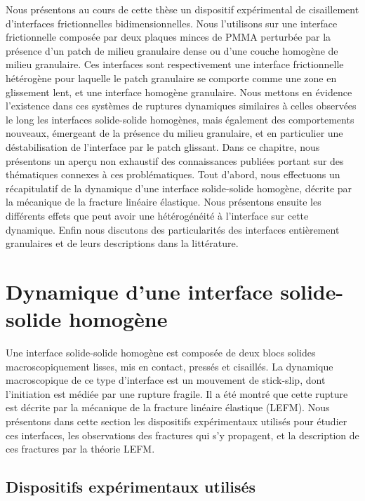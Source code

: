 Nous présentons au cours de cette thèse un dispositif expérimental de cisaillement d'interfaces frictionnelles bidimensionnelles. Nous l'utilisons sur une interface frictionnelle composée par deux plaques minces de PMMA perturbée par la présence d'un patch de milieu granulaire dense ou d'une couche homogène de milieu granulaire. Ces interfaces sont respectivement une interface frictionnelle hétérogène pour laquelle le patch granulaire se comporte comme une zone en glissement lent, et une interface homogène granulaire. Nous mettons en évidence l'existence dans ces systèmes de ruptures dynamiques similaires à celles observées le long les interfaces solide-solide homogènes, mais également des comportements nouveaux, émergeant de la présence du milieu granulaire, et en particulier une déstabilisation de l'interface par le patch glissant. Dans ce chapitre, nous présentons un aperçu non exhaustif des connaissances publiées portant sur des thématiques connexes à ces problématiques. Tout d'abord, nous effectuons un récapitulatif de la dynamique d'une interface solide-solide homogène, décrite par la mécanique de la fracture linéaire élastique. Nous présentons ensuite les différents effets que peut avoir une hétérogénéité à l'interface sur cette dynamique. Enfin nous discutons des particularités des interfaces entièrement granulaires et de leurs descriptions dans la littérature.



\newpage

\minitoc

\newpage


\section{Dynamique d'une interface solide-solide homogène}

Une interface solide-solide homogène est composée de deux blocs solides macroscopiquement lisses, mis en contact, pressés et cisaillés. La dynamique macroscopique de ce type d'interface est un mouvement de stick-slip, dont l'initiation est médiée par une rupture fragile. Il a été montré que cette rupture est décrite par la mécanique de la fracture linéaire élastique (LEFM). Nous présentons dans cette section les dispositifs expérimentaux utilisés pour étudier ces interfaces, les observations des fractures qui s'y propagent, et la description de ces fractures par la théorie LEFM.

\subsection{Dispositifs expérimentaux utilisés}

